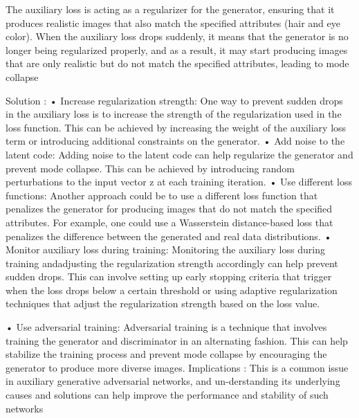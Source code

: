 \documentclass{article}
\begin{document}
The auxiliary loss is acting as a regularizer for the generator, ensuring that it
produces realistic images that also match the specified attributes (hair and eye color). When the auxiliary loss drops suddenly, it means that the generator is no longer being regularized properly, and as a result, it may start producing images that are only realistic but do not match the specified attributes, leading to mode collapse

Solution :
• Increase regularization strength: One way to prevent sudden drops in the auxiliary loss is to increase the strength of the regularization used in the loss function. This can be achieved by increasing the weight of the auxiliary loss term or introducing additional constraints on
the generator.
• Add noise to the latent code: Adding noise to the latent code can help regularize the generator and prevent mode collapse. This can be achieved by introducing random perturbations to the input vector z at each training iteration.
• Use different loss functions: Another approach could be to use a different loss function that penalizes the generator for producing images that do not match the specified attributes. For example, one could use a Wasserstein distance-based loss that penalizes the difference between the generated and real data distributions.
• Monitor auxiliary loss during training: Monitoring the auxiliary loss during training andadjusting the regularization strength accordingly can help prevent sudden drops. This can involve setting up early stopping criteria that trigger when the loss drops below a certain threshold or using adaptive regularization techniques that adjust the regularization strength based on the loss value.

• Use adversarial training: Adversarial training is a technique that involves training the
generator and discriminator in an alternating fashion. This can help stabilize the training process and prevent mode collapse by encouraging the generator to produce more diverse
images. Implications : This is a common issue in auxiliary generative adversarial networks, and un-derstanding its underlying causes and solutions can help improve the performance and stability of such networks

\nocite{*}


\end{document}
